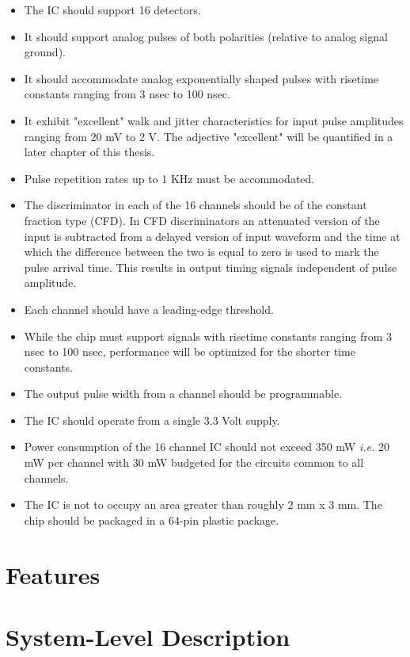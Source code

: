 \documentclass[12pt,oneside,final]{siuethesis}
\theoremstyle{definition}
\begin{document}
\begin{itemize}
\item
The IC should support 16 detectors.
\item
It should support analog pulses of both polarities (relative to analog signal ground).
\item
It should accommodate analog exponentially shaped pulses with risetime constants ranging from 3 nsec to 100 nsec.
\item
It exhibit "excellent" walk and jitter characteristics for input pulse amplitudes ranging from 20 mV to 2 V. The adjective "excellent" will be quantified in a later chapter of this thesis.
\item
Pulse repetition rates up to 1 KHz must be accommodated.
\item
The discriminator in each of the 16 channels should be of the constant fraction type (CFD). In CFD discriminators an attenuated version of the input is subtracted from a delayed version of input waveform and the time at which the difference between the two is equal to zero is used to mark the pulse arrival time. This results in output timing signals independent of pulse amplitude.
\item
Each channel should have a leading-edge threshold.
\item
While the chip must support signals with risetime constants ranging from 3 nsec to 100 nsec, performance will be optimized for the shorter time constants. 
\item
The output pulse width from a channel should be programmable.
\item
The IC should operate from a single 3.3 Volt supply.
\item
Power consumption of the 16 channel IC should not exceed 350 mW \emph{i.e.} 20 mW per channel with 30 mW budgeted for the circuits common to all channels. 
\item
The IC is not to occupy an area greater than roughly 2 mm x 3 mm.  The chip should be packaged in a 64-pin plastic package.  

\end{itemize} 

\section{Features}

\section{System-Level Description}
\end{document}
